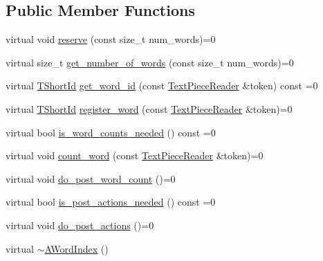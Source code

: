 \subsection*{Public Member Functions}
\begin{DoxyCompactItemize}
\item 
virtual void \hyperlink{classuva_1_1smt_1_1tries_1_1dictionary_1_1_a_word_index_a689b450039f29db04b29824b962afd9d}{reserve} (const size\+\_\+t num\+\_\+words)=0
\item 
virtual size\+\_\+t \hyperlink{classuva_1_1smt_1_1tries_1_1dictionary_1_1_a_word_index_a89294cc177e2c701ba43a87c88ade4d4}{get\+\_\+number\+\_\+of\+\_\+words} (const size\+\_\+t num\+\_\+words)=0
\item 
virtual \hyperlink{namespaceuva_1_1smt_1_1hashing_adcf22e1982ad09d3a63494c006267469}{T\+Short\+Id} \hyperlink{classuva_1_1smt_1_1tries_1_1dictionary_1_1_a_word_index_a23386149ef251966ced00130fa703d68}{get\+\_\+word\+\_\+id} (const \hyperlink{classuva_1_1smt_1_1file_1_1_text_piece_reader}{Text\+Piece\+Reader} \&token) const  =0
\item 
virtual \hyperlink{namespaceuva_1_1smt_1_1hashing_adcf22e1982ad09d3a63494c006267469}{T\+Short\+Id} \hyperlink{classuva_1_1smt_1_1tries_1_1dictionary_1_1_a_word_index_aa1ccab0128595c2296cf65099de5d28f}{register\+\_\+word} (const \hyperlink{classuva_1_1smt_1_1file_1_1_text_piece_reader}{Text\+Piece\+Reader} \&token)=0
\item 
virtual bool \hyperlink{classuva_1_1smt_1_1tries_1_1dictionary_1_1_a_word_index_abf2e3da506e15aba952dbdbefdf301bd}{is\+\_\+word\+\_\+counts\+\_\+needed} () const  =0
\item 
virtual void \hyperlink{classuva_1_1smt_1_1tries_1_1dictionary_1_1_a_word_index_af802919ae94e6e6aeeec82a8e880b50c}{count\+\_\+word} (const \hyperlink{classuva_1_1smt_1_1file_1_1_text_piece_reader}{Text\+Piece\+Reader} \&token)=0
\item 
virtual void \hyperlink{classuva_1_1smt_1_1tries_1_1dictionary_1_1_a_word_index_a353853aa594ca7c23f18e4804fa09dab}{do\+\_\+post\+\_\+word\+\_\+count} ()=0
\item 
virtual bool \hyperlink{classuva_1_1smt_1_1tries_1_1dictionary_1_1_a_word_index_ad06633d5705710089e467e84e5fd1aa0}{is\+\_\+post\+\_\+actions\+\_\+needed} () const  =0
\item 
virtual void \hyperlink{classuva_1_1smt_1_1tries_1_1dictionary_1_1_a_word_index_a45c07a088bac4655a3084ef301f312c6}{do\+\_\+post\+\_\+actions} ()=0
\item 
virtual \hyperlink{classuva_1_1smt_1_1tries_1_1dictionary_1_1_a_word_index_add51fdbee0f95e39c6ffee341ad8d586}{$\sim$\+A\+Word\+Index} ()
\end{DoxyCompactItemize}
